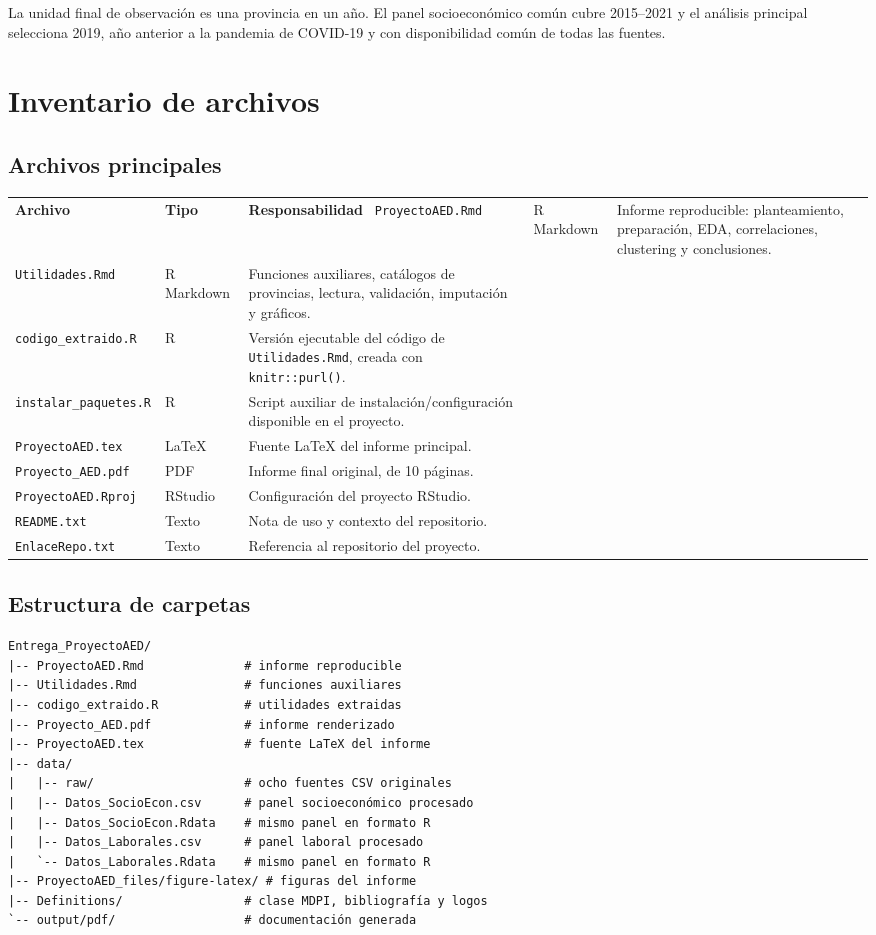 \documentclass[11pt,a4paper]{article}
\newcommand{\code}[1]{\texttt{\small #1}}
\begin{document}
La unidad final de observación es una provincia en un año. El panel socioeconómico común cubre 2015--2021 y el análisis principal selecciona 2019, año anterior a la pandemia de COVID-19 y con disponibilidad común de todas las fuentes.

\section{Inventario de archivos}
\subsection{Archivos principales}
\begin{longtable}{p{}p{}p{}}
\toprule
\textbf{Archivo} & \textbf{Tipo} & \textbf{Responsabilidad}\
\midrule
\endhead
\code{ProyectoAED.Rmd} & R Markdown & Informe reproducible: planteamiento, preparación, EDA, correlaciones, clustering y conclusiones.\\
\code{Utilidades.Rmd} & R Markdown & Funciones auxiliares, catálogos de provincias, lectura, validación, imputación y gráficos.\\
\code{codigo\_extraido.R} & R & Versión ejecutable del código de \code{Utilidades.Rmd}, creada con \code{knitr::purl()}.\\
\code{instalar\_paquetes.R} & R & Script auxiliar de instalación/configuración disponible en el proyecto.\\
\code{ProyectoAED.tex} & LaTeX & Fuente LaTeX del informe principal.\\
\code{Proyecto\_AED.pdf} & PDF & Informe final original, de 10 páginas.\\
\code{ProyectoAED.Rproj} & RStudio & Configuración del proyecto RStudio.\\
\code{README.txt} & Texto & Nota de uso y contexto del repositorio.\\
\code{EnlaceRepo.txt} & Texto & Referencia al repositorio del proyecto.\\
\bottomrule
\end{longtable}

\subsection{Estructura de carpetas}
\begin{verbatim}
Entrega_ProyectoAED/
|-- ProyectoAED.Rmd              # informe reproducible
|-- Utilidades.Rmd               # funciones auxiliares
|-- codigo_extraido.R            # utilidades extraidas
|-- Proyecto_AED.pdf             # informe renderizado
|-- ProyectoAED.tex              # fuente LaTeX del informe
|-- data/
|   |-- raw/                     # ocho fuentes CSV originales
|   |-- Datos_SocioEcon.csv      # panel socioeconómico procesado
|   |-- Datos_SocioEcon.Rdata    # mismo panel en formato R
|   |-- Datos_Laborales.csv      # panel laboral procesado
|   `-- Datos_Laborales.Rdata    # mismo panel en formato R
|-- ProyectoAED_files/figure-latex/ # figuras del informe
|-- Definitions/                 # clase MDPI, bibliografía y logos
`-- output/pdf/                  # documentación generada
\end{verbatim}
\end{document}
